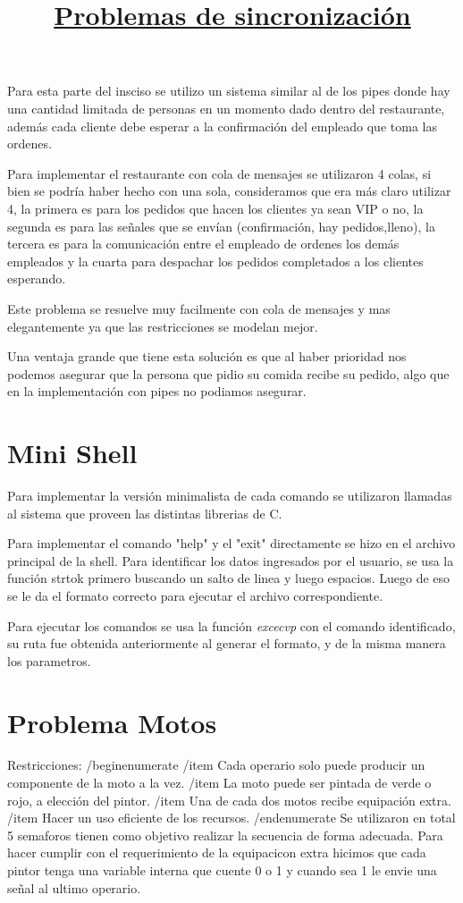 \documentclass[11pt]{article} %
\begin{document}
Para esta parte del insciso se utilizo un sistema similar al de los pipes donde hay una cantidad limitada de personas en un momento dado dentro del restaurante, además cada cliente debe esperar a la confirmación del empleado que toma las ordenes.

Para implementar el restaurante con cola de mensajes se utilizaron 4 colas, si bien se podría haber hecho con una sola, consideramos que era más claro utilizar 4, la primera es para los pedidos que hacen los clientes ya sean VIP o no, la segunda es para las señales que se envían (confirmación, hay pedidos,lleno), la tercera es para la comunicación entre el empleado de ordenes  los demás empleados y la cuarta para despachar los pedidos completados a los clientes esperando.

Este problema se resuelve muy facilmente con cola de mensajes y mas elegantemente ya que las restricciones se modelan mejor.

Una ventaja grande que tiene esta solución es que al haber prioridad nos podemos asegurar que la persona que pidio su comida recibe su pedido, algo que en la implementación con pipes no podiamos asegurar.



\section{Mini Shell}
Para implementar la versión minimalista de cada comando se utilizaron llamadas al sistema que proveen las distintas librerias de C.

Para implementar el comando "help" y el "exit" directamente se hizo en el archivo principal de la shell. Para identificar los datos ingresados por el usuario, se usa la función strtok primero buscando un salto de linea y luego espacios. Luego de eso se le da el formato correcto para ejecutar el archivo correspondiente.

Para ejecutar los comandos se usa la función \textit{excecvp} con el comando identificado, su ruta fue obtenida anteriormente al generar el formato, y de la misma manera los parametros.

\hfill \break
\title{\huge \underline{Problemas de sincronización}}

\section{Problema Motos}
Restricciones:
/begin{enumerate}
 /item Cada operario solo puede producir un componente de la moto a la vez.
 /item La moto puede ser pintada de verde o rojo, a elección del pintor.
 /item Una de cada dos motos recibe equipación extra.
 /item Hacer un uso eficiente de los recursos.
/end{enumerate}
Se utilizaron en total 5 semaforos tienen como objetivo
realizar la secuencia de forma adecuada. Para hacer cumplir con el requerimiento de la equipacicon extra hicimos que cada pintor tenga una variable interna que cuente 0 o 1 y cuando sea 1 le envie una señal al ultimo operario.
\end{document}
